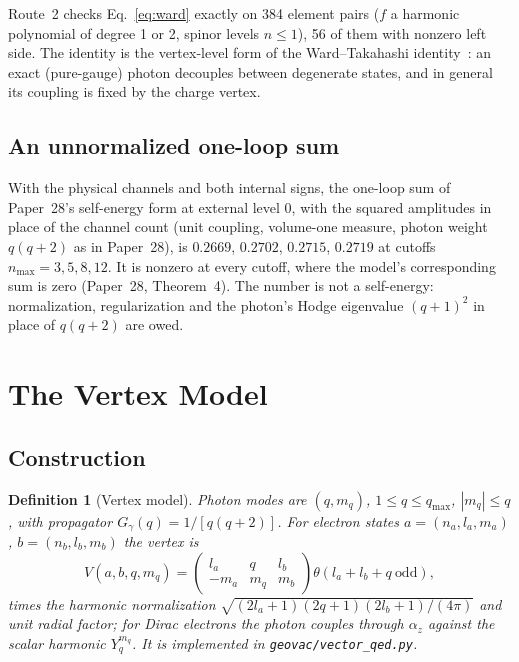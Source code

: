 \documentclass[11pt]{article}
\newtheorem{definition}{Definition}
\begin{document}
Route~2 checks Eq.~\eqref{eq:ward} exactly on 384 element pairs ($f$ a
harmonic polynomial of degree 1 or 2, spinor levels $n \le 1$), 56 of
them with nonzero left side.  The identity is the vertex-level form of
the Ward--Takahashi identity~\cite{ward1950,takahashi1957}: an exact
(pure-gauge) photon decouples between degenerate states, and in general
its coupling is fixed by the charge vertex.

\subsection{An unnormalized one-loop sum}

With the physical channels and both internal signs, the one-loop sum of
Paper~28's self-energy form at external level $0$, with the squared
amplitudes in place of the channel count (unit coupling, volume-one
measure, photon weight $q(q+2)$ as in Paper~28), is $0.2669$, $0.2702$,
$0.2715$, $0.2719$ at cutoffs $n_{\max} = 3, 5, 8, 12$.  It is nonzero
at every cutoff, where the model's corresponding sum is zero (Paper~28,
Theorem~4).  The number is not a self-energy: normalization,
regularization and the photon's Hodge eigenvalue $(q+1)^2$ in place of
$q(q+2)$ are owed.

\section{The Vertex Model}
\label{sec:model}

\subsection{Construction}

\begin{definition}[Vertex model]
\label{def:vertex}
Photon modes are $(q, m_q)$, $1 \le q \le q_{\max}$, $|m_q| \le q$, with
propagator $G_\gamma(q) = 1/[q(q+2)]$.  For electron states
$a = (n_a, l_a, m_a)$, $b = (n_b, l_b, m_b)$ the vertex is
\begin{equation}
   V(a, b, q, m_q) = \begin{pmatrix} l_a & q & l_b \\ -m_a & m_q & m_b
   \end{pmatrix} \theta(l_a + l_b + q ~ \text{odd}),
   \label{eq:vertex}
\end{equation}
times the harmonic normalization
$\sqrt{(2l_a+1)(2q+1)(2l_b+1)/(4\pi)}$ and unit radial factor; for Dirac
electrons the photon couples through $\alpha_z$ against the scalar
harmonic $Y_q^{m_q}$.  It is implemented in \texttt{geovac/vector\_qed.py}.
\end{definition}
\end{document}
